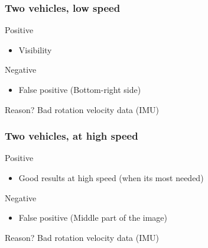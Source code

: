 \documentclass{beamer}
\begin{document}
	\begin{frame}
		\frametitle{Two vehicles, low speed}
		\begin{exampleblock}{Positive}
		\begin{itemize}
		\item Visibility
		\end{itemize}
		\end{exampleblock}
						
		\begin{alertblock}{Negative}
		\begin{itemize}
		\item False positive (Bottom-right side)
		\end{itemize}
		\end{alertblock}					

		\begin{block}{Reason?}
		Bad rotation velocity data (IMU)
		\end{block}
		
	\end{frame}
	\begin{frame}
		\frametitle{Two vehicles, at high speed}
		\begin{exampleblock}{Positive}
		\begin{itemize}
		\item Good results at high speed (when its most needed)
		\end{itemize}
		\end{exampleblock}
						
		\begin{alertblock}{Negative}
		\begin{itemize}
		\item False positive (Middle part of the image)
		\end{itemize}
		\end{alertblock}					

		\begin{block}{Reason?}
		Bad rotation velocity data (IMU)
		\end{block}		
	\end{frame}
	
\end{document}

